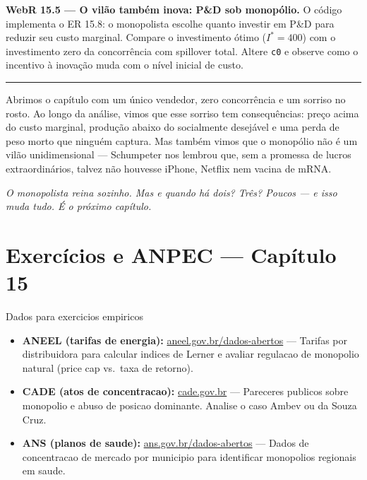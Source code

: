 \documentclass[11pt,twoside,openright]{book}
\providecommand{\tightlist}{\setlength{\itemsep}{0pt}\setlength{\parskip}{0pt}}
\begin{document}
\textbf{WebR 15.5 --- O vilão também inova: P\&D sob monopólio.} O
código implementa o ER 15.8: o monopolista escolhe quanto investir em
P\&D para reduzir seu custo marginal. Compare o investimento ótimo
(\(I^* = 400\)) com o investimento zero da concorrência com spillover
total. Altere \texttt{c0} e observe como o incentivo à inovação muda com
o nível inicial de custo.

\begin{center}\rule{0.5\linewidth}{0.5pt}\end{center}

Abrimos o capítulo com um único vendedor, zero concorrência e um sorriso
no rosto. Ao longo da análise, vimos que esse sorriso tem consequências:
preço acima do custo marginal, produção abaixo do socialmente desejável
e uma perda de peso morto que ninguém captura. Mas também vimos que o
monopólio não é um vilão unidimensional --- Schumpeter nos lembrou que,
sem a promessa de lucros extraordinários, talvez não houvesse iPhone,
Netflix nem vacina de mRNA.

\emph{O monopolista reina sozinho. Mas e quando há dois? Três? Poucos
--- e isso muda tudo. É o próximo capítulo.}

\chapter{Exercícios e ANPEC --- Capítulo
15}\label{exercuxedcios-e-anpec-capuxedtulo-15}

\begin{tipbox}{Dados para exercicios empiricos}

\begin{itemize}
\tightlist
\item
  \textbf{ANEEL (tarifas de energia):}
  \href{https://www.aneel.gov.br/dados-abertos}{aneel.gov.br/dados-abertos}
  --- Tarifas por distribuidora para calcular indices de Lerner e
  avaliar regulacao de monopolio natural (price cap vs.~taxa de
  retorno).
\item
  \textbf{CADE (atos de concentracao):}
  \href{https://www.gov.br/cade/pt-br}{cade.gov.br} --- Pareceres
  publicos sobre monopolio e abuso de posicao dominante. Analise o caso
  Ambev ou da Souza Cruz.
\item
  \textbf{ANS (planos de saude):}
  \href{https://dados.gov.br/dados/organizacoes/visualizar/agencia-nacional-de-saude-suplementar-ans}{ans.gov.br/dados-abertos}
  --- Dados de concentracao de mercado por municipio para identificar
  monopolios regionais em saude.
\end{itemize}

\end{tipbox}
\end{document}
